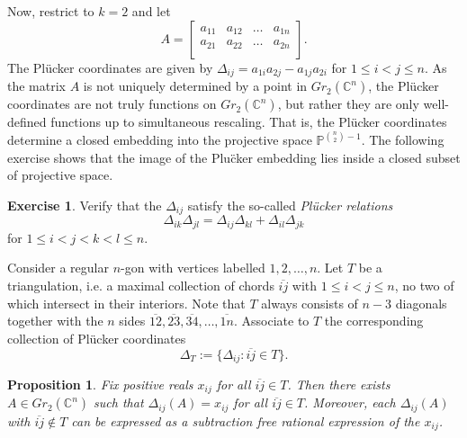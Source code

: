 \documentclass{amsart}
\newtheorem{proposition}[theorem]{Proposition}
\theoremstyle{definition}
\newtheorem{exercise}[theorem]{Exercise}
\theoremstyle{remark}
\numberwithin{equation}{section}
\newcommand{\CC}{{\mathbb{C}}}
\newcommand{\PP}{{\mathbb{P}}}
\begin{document}
		Now, restrict to $k=2$ and let 
		\begin{displaymath}
			A = \left[ \begin{array}{cccc}
			a_{11} & a_{12} & \ldots & a_{1n} \\
			a_{21} & a_{22} & \ldots & a_{2n} \\
			\end{array} \right].
		\end{displaymath}
		The Pl\"ucker coordinates are given by $\Delta_{ij} = a_{1i}a_{2j} - a_{1j}a_{2i}$ for $1 \leq i < j \leq n$.  As the matrix $A$ is not uniquely determined by a point in $Gr_2(\CC^n)$, the Pl\"ucker coordinates are not truly functions on $Gr_2(\CC^n)$, but rather they are only well-defined functions up to simultaneous rescaling.  That is, the Pl\"ucker coordinates determine a closed embedding into the projective space $\PP^{{n\choose 2}-1}$.  The following exercise shows that the image of the Plu\"cker embedding lies inside a closed subset of projective space.
		\begin{exercise}
			Verify that the $\Delta_{ij}$ satisfy the so-called \emph{Pl\"ucker relations}
			\begin{equation}\label{eq:short plucker special}
				\Delta_{ik}\Delta_{jl} = \Delta_{ij}\Delta_{kl} + \Delta_{il}\Delta_{jk}
			\end{equation}
			for $1 \leq i < j < k < l \leq n$.
		\end{exercise}
		
		Consider a regular $n$-gon with vertices labelled $1,2,\ldots, n$.  Let $T$ be a triangulation, i.e. a maximal collection of chords $\overline{ij}$ with $1 \leq i < j \leq n$, no two of which intersect in their interiors.  Note that $T$ always consists of $n-3$ diagonals together with the $n$ sides $\overline{12}, \overline{23}, \overline{34}, \ldots, \overline{1n}$.  Associate to $T$ the corresponding collection of Pl\"ucker coordinates
		\begin{displaymath}
			\Delta_T := \{\Delta_{ij} : \overline{ij} \in T\}.
		\end{displaymath}
    \setcounter{subproposition}{1}
		\begin{proposition} \label{prop:Gr2n}
		Fix positive reals $x_{ij}$ for all $\overline{ij} \in T$.  Then there exists $A \in Gr_2(\CC^n)$ such that $\Delta_{ij}(A) = x_{ij}$ for all $\overline{ij} \in T$.  Moreover, each $\Delta_{ij}(A)$ with $\overline{ij} \notin T$ can be expressed as a subtraction free rational expression of the $x_{ij}$.
		\end{proposition}
		
\end{document}
